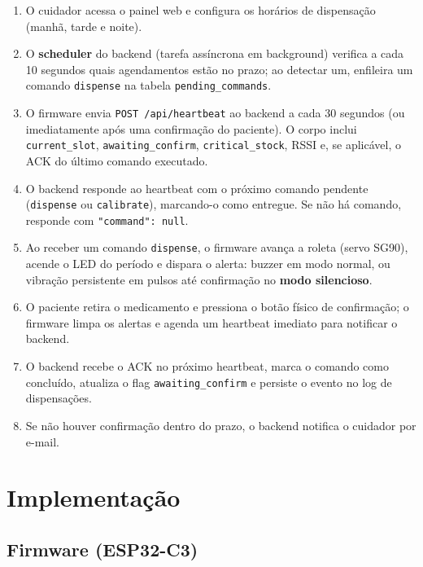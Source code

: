 \documentclass[12pt,a4paper]{article}
\begin{document}
\begin{enumerate}
    \item O cuidador acessa o painel web e configura os horários de dispensação (manhã, tarde e noite).
    \item O \textbf{scheduler} do backend (tarefa assíncrona em background) verifica a cada 10 segundos quais agendamentos estão no prazo; ao detectar um, enfileira um comando \texttt{dispense} na tabela \texttt{pending\_commands}.
    \item O firmware envia \texttt{POST /api/heartbeat} ao backend a cada 30 segundos (ou imediatamente após uma confirmação do paciente). O corpo inclui \texttt{current\_slot}, \texttt{awaiting\_confirm}, \texttt{critical\_stock}, RSSI e, se aplicável, o ACK do último comando executado.
    \item O backend responde ao heartbeat com o próximo comando pendente (\texttt{dispense} ou \texttt{calibrate}), marcando-o como entregue. Se não há comando, responde com \texttt{"command": null}.
    \item Ao receber um comando \texttt{dispense}, o firmware avança a roleta (servo SG90), acende o LED do período e dispara o alerta: buzzer em modo normal, ou vibração persistente em pulsos até confirmação no \textbf{modo silencioso}.
    \item O paciente retira o medicamento e pressiona o botão físico de confirmação; o firmware limpa os alertas e agenda um heartbeat imediato para notificar o backend.
    \item O backend recebe o ACK no próximo heartbeat, marca o comando como concluído, atualiza o flag \texttt{awaiting\_confirm} e persiste o evento no log de dispensações.
    \item Se não houver confirmação dentro do prazo, o backend notifica o cuidador por e-mail.
\end{enumerate}

\newpage

\section{Implementação}

\subsection{Firmware (ESP32-C3)}
\end{document}
